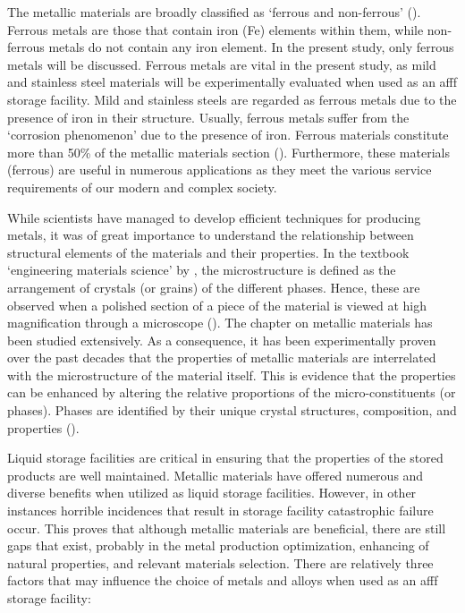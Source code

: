 The metallic materials are broadly classified as ‘ferrous and non-ferrous’ (\cite{ali2020empirical}). Ferrous metals are those that contain iron (Fe) elements within them, while non-ferrous metals do not contain any iron element. In the present study, only ferrous metals will be discussed. Ferrous metals are vital in the present study, as mild and stainless steel materials will be experimentally evaluated when used as an \acrshort{afff} storage facility.  Mild and stainless steels are regarded as ferrous metals due to the presence of iron in their structure. Usually, ferrous metals suffer from the ‘corrosion phenomenon’ due to the presence of iron. Ferrous materials constitute more than 50\% of the metallic materials section (\cite{ali2020empirical}). Furthermore, these materials (ferrous) are useful in numerous applications as they meet the various service requirements of our modern and complex society.

While scientists have managed to develop efficient techniques for producing metals, it was of great importance to understand the relationship between structural elements of the materials and their properties. In the textbook ‘engineering materials science’ by \cite{mcarthur2004engineering}, the microstructure is defined as the arrangement of crystals (or grains) of the different phases. Hence, these are observed when a polished section of a piece of the material is viewed at high magnification through a microscope (\cite{molabe2018determining}). The chapter on metallic materials has been studied extensively. As a consequence, it has been experimentally proven over the past decades that the properties of metallic materials are interrelated with the microstructure of the material itself. This is evidence that the properties can be enhanced by altering the relative proportions of the micro-constituents (or phases). Phases are identified by their unique crystal structures, composition, and properties (\cite{mcarthur2004engineering}).

Liquid storage facilities are critical in ensuring that the properties of the stored products are well maintained. Metallic materials have offered numerous and diverse benefits when utilized as liquid storage facilities. However, in other instances horrible incidences that result in storage facility catastrophic failure occur. This proves that although metallic materials are beneficial, there are still gaps that exist, probably in the metal production optimization, enhancing of natural properties, and relevant materials selection. There are relatively three factors that may influence the choice of metals and alloys when used as an \acrshort{afff} storage facility:

